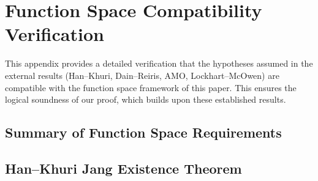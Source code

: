 \section{Function Space Compatibility Verification}\label{app:function-spaces}

This appendix provides a detailed verification that the hypotheses assumed in the external results (Han--Khuri, Dain--Reiris, AMO, Lockhart--McOwen) are compatible with the function space framework of this paper. This ensures the logical soundness of our proof, which builds upon these established results.

\subsection{Summary of Function Space Requirements}

\begin{table}[htbp]
\centering
\scriptsize
\setlength{\tabcolsep}{3pt}
\renewcommand{\arraystretch}{1.3}
\caption{Function space compatibility between external results and our hypotheses.}
\label{tab:compatibility}
\end{table}

\subsection{Han--Khuri Jang Existence Theorem}

